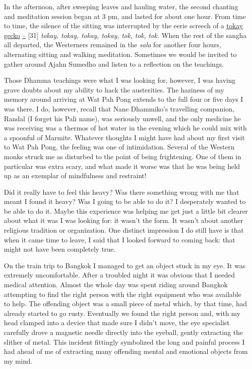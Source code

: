 In the afternoon, after sweeping leaves and hauling water, the second
chanting and meditation session began at 3 pm, and lasted for about one
hour. From time to time, the silence of the sitting was interrupted by
the eerie screech of a
\href{https://en.wikipedia.org/wiki/Tokay_gecko}{\underline{tokay}
\underline{gecko}} \underline{--} {[}31{]} \emph{tokay, tokay, tokay,
tokay, tok, tok, tok.} When the rest of the sangha all departed, the
Westerners remained in the \emph{sala} for another four hours,
alternating sitting and walking meditation. Sometimes we would be
invited to gather around Ajahn Sumedho and listen to a reflection on the
teachings.

Those Dhamma teachings were what I was looking for, however, I was
having grave doubts about my ability to hack the austerities. The
haziness of my memory around arriving at Wat Pah Pong extends to the
full four or five days I was there. I do, however, recall that Nane
Dhammiko's travelling companion, Randal (I forget his Pali name), was
seriously unwell, and the only medicine he was receiving was a thermos
of hot water in the evening which he could mix with a spoonful of
Marmite. Whatever thoughts I might have had about my first visit to Wat
Pah Pong, the feeling was one of intimidation. Several of the Western
monks struck me as disturbed to the point of being frightening. One of
them in particular was extra scary, and what made it worse was that he
was being held up as an exemplar of mindfulness and restraint!

Did it really have to feel this heavy? Was there something wrong with me
that meant I found it heavy? Was I going to be able to do it? I
desperately wanted to be able to do it. Maybe this experience was
helping me get just a little bit clearer about what it was I was looking
for: it wasn't the form. It wasn't about another religious tradition or
organization. One distinct impression I do still have is that when it
came time to leave, I said that I looked forward to coming back: that
might not have been completely true.

On the train trip to Bangkok I managed to get an object stuck in my eye.
It was extremely uncomfortable. After a troubled night it was obvious
that I needed medical attention. Almost the whole day was spent riding
around Bangkok attempting to find the right person with the right
equipment who was available to help. The offending object was a small
piece of metal which, by that time, had already started to go rusty.
Eventually we found the right person and, with my head clamped into a
device that made sure I didn't move, the eye specialist carefully drove
a magnetic needle directly into the eyeball, gently extracting the
slither of metal. This incident fittingly symbolized the long and
painful process I had ahead of me of extracting many offending mental
and emotional objects from my mind.

